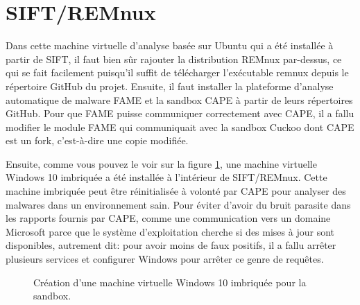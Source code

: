 \section{SIFT/REMnux}

Dans cette machine virtuelle d'analyse basée sur Ubuntu qui a été installée à partir de SIFT, il faut bien sûr rajouter la distribution REMnux par-dessus, ce qui se fait facilement puisqu'il suffit de télécharger l'exécutable remnux depuis le répertoire GitHub du projet. Ensuite, il faut installer la plateforme d'analyse automatique de malware FAME et la sandbox CAPE à partir de leurs répertoires GitHub. Pour que FAME puisse communiquer correctement avec CAPE, il a fallu modifier le module FAME qui communiquait avec la sandbox Cuckoo dont CAPE est un fork, c'est-à-dire une copie modifiée.

Ensuite, comme vous pouvez le voir sur la figure \ref{fig:virt-manager}, une machine virtuelle Windows 10 imbriquée a été installée à l'intérieur de SIFT/REMnux. Cette machine imbriquée peut être réinitialisée à volonté par CAPE pour analyser des malwares dans un environnement sain. Pour éviter d'avoir du bruit parasite dans les rapports fournis par CAPE, comme une communication vers un domaine Microsoft parce que le système d'exploitation cherche si des mises à jour sont disponibles, autrement dit: pour avoir moins de faux positifs, il a fallu arrêter plusieurs services et configurer Windows pour arrêter ce genre de requêtes.

\begin{figure}[H]
    \centering
    \caption{Création d'une machine virtuelle Windows 10 imbriquée pour la sandbox.}
    \label{fig:virt-manager}
\end{figure}






